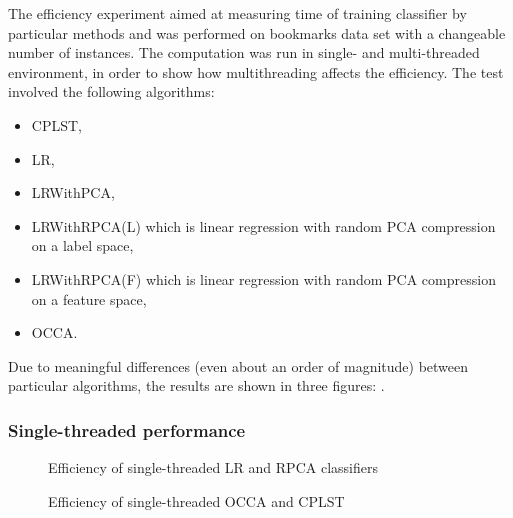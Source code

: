 The efficiency experiment aimed at measuring time of training classifier by particular methods and was performed on bookmarks data set with a changeable number of instances. The computation was run in single- and multi-threaded environment, in order to show how multithreading affects the efficiency. The test involved the following algorithms:
\begin{itemize}
    \item CPLST,
    \item LR,
    \item LRWithPCA,
    \item LRWithRPCA(L) which is linear regression with random PCA compression on a label space,
    \item LRWithRPCA(F) which is linear regression with random PCA compression on a feature space,
    \item OCCA.
\end{itemize}
Due to meaningful differences (even about an order of magnitude) between particular algorithms, the results are shown in three figures: .

\newpage
\subsubsection{Single-threaded performance}

\begin{figure}[H]
\centering
\caption{Efficiency of single-threaded LR and RPCA classifiers}
\label{fig:exp29}
\end{figure}

\begin{figure}[H]
\centering
\caption{Efficiency of single-threaded OCCA and CPLST}
\label{fig:exp30}
\end{figure}

